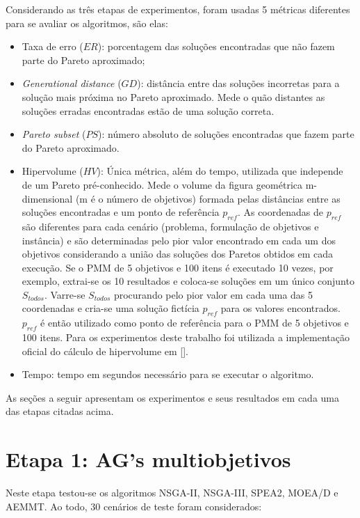 Considerando as três etapas de experimentos, foram usadas 5 métricas diferentes para se avaliar os algoritmos, são elas:

\begin{itemize}
	\item Taxa de erro ($ER$): porcentagem das soluções encontradas que não fazem parte do Pareto aproximado;
	\item \textit{Generational distance} ($GD$): distância entre das soluções incorretas para a solução mais próxima no Pareto aproximado. Mede o quão distantes as soluções erradas encontradas estão de uma solução correta.
	\item \textit{Pareto subset} ($PS$): número absoluto de soluções encontradas que fazem parte do Pareto aproximado.
	\item Hipervolume ($HV$): Única métrica, além do tempo, utilizada que independe de um Pareto pré-conhecido. Mede o volume da figura geométrica m-dimensional (m é o número de objetivos) formada pelas distâncias entre as soluções encontradas e um ponto de referência $p_{ref}$. As coordenadas de $p_{ref}$ são diferentes para cada cenário (problema, formulação de objetivos e instância) e são determinadas pelo pior valor encontrado em cada um dos objetivos considerando a união das soluções dos Paretos obtidos em cada execução. Se o PMM de 5 objetivos e 100 itens é executado 10 vezes, por exemplo, extrai-se os 10 resultados e coloca-se soluções em um único conjunto $S_{todos}$. Varre-se $S_{todos}$ procurando pelo pior valor em cada uma das 5 coordenadas e cria-se uma solução fictícia $p_{ref}$ para os valores encontrados. $p_{ref}$ é então utilizado como ponto de referência para o PMM de 5 objetivos e 100 itens. Para os experimentos deste trabalho foi utilizada a implementação oficial do cálculo de hipervolume em [].
	\item Tempo: tempo em segundos necessário para se executar o algoritmo.
\end{itemize}

As seções a seguir apresentam os experimentos e seus resultados em cada uma das etapas citadas acima.

\section{Etapa 1: AG's multiobjetivos}

Neste etapa testou-se os algoritmos NSGA-II, NSGA-III, SPEA2, MOEA/D e AEMMT. Ao todo, 30 cenários de teste foram considerados:

